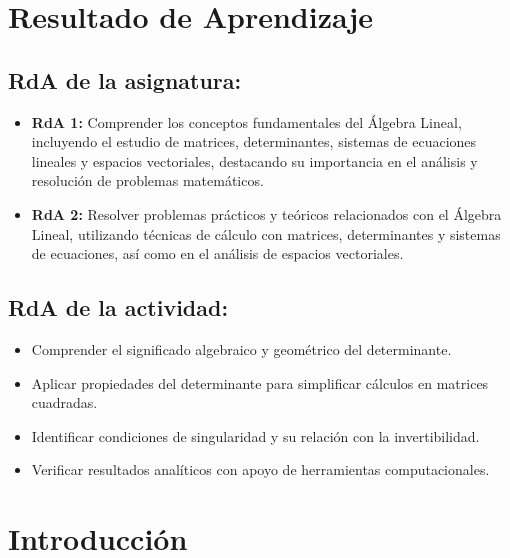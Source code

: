 \documentclass[a4,11pt]{aleph-notas}
\begin{document}
\encabezado 

\section*{Resultado de Aprendizaje}

\subsection*{RdA de la asignatura:}
\begin{itemize}[leftmargin=*]
    \item \textbf{RdA 1:} Comprender los conceptos fundamentales del Álgebra Lineal, incluyendo el estudio de matrices, determinantes, sistemas de ecuaciones lineales y espacios vectoriales, destacando su importancia en el análisis y resolución de problemas matemáticos.
    \item \textbf{RdA 2:} Resolver problemas prácticos y teóricos relacionados con el Álgebra Lineal, utilizando técnicas de cálculo con matrices, determinantes y sistemas de ecuaciones, así como en el análisis de espacios vectoriales.
\end{itemize}


\subsection*{RdA de la actividad:}
\begin{itemize}[leftmargin=*]
    \item Comprender el significado algebraico y geométrico del determinante.
    \item Aplicar propiedades del determinante para simplificar cálculos en matrices cuadradas.
    \item Identificar condiciones de singularidad y su relación con la invertibilidad.
    \item Verificar resultados analíticos con apoyo de herramientas computacionales.
\end{itemize}

\section*{Introducción}

\end{document}
